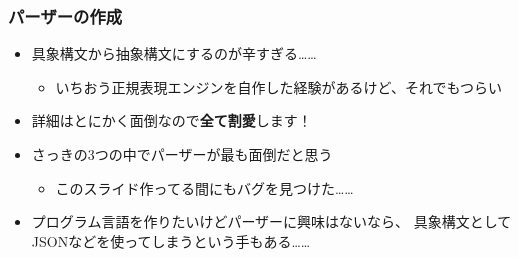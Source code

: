 \begin{frame}
  \frametitle{パーザーの作成}

  \pause

  \pause
  \begin{itemize}
    \item<+-> 具象構文から抽象構文にするのが辛すぎる……
    \begin{itemize}
      \item いちおう正規表現エンジンを自作した経験があるけど、それでもつらい
    \end{itemize}

    \item<+-> 詳細はとにかく面倒なので\textbf{全て割愛}します！

    \item<+-> さっきの3つの中でパーザーが最も面倒だと思う
    \begin{itemize}
      \item このスライド作ってる間にもバグを見つけた……
    \end{itemize}

    \item<+-> プログラム言語を作りたいけどパーザーに興味はないなら、
    具象構文としてJSONなどを使ってしまうという手もある……
  \end{itemize}
\end{frame}

